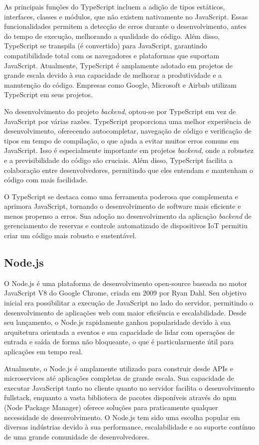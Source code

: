 As principais funções do TypeScript incluem a adição de tipos estáticos, interfaces, classes e módulos, que não existem nativamente no JavaScript. Essas funcionalidades permitem a detecção de erros durante o desenvolvimento, antes do tempo de execução, melhorando a qualidade do código. Além disso, TypeScript se transpila (é convertido) para JavaScript, garantindo compatibilidade total com os navegadores e plataformas que suportam JavaScript. Atualmente, TypeScript é amplamente adotado em projetos de grande escala devido à sua capacidade de melhorar a produtividade e a manutenção do código. Empresas como Google, Microsoft e Airbnb utilizam TypeScript em seus projetos.

No desenvolvimento do projeto \textit{backend}, optou-se por TypeScript em vez de JavaScript por várias razões. TypeScript proporciona uma melhor experiência de desenvolvimento, oferecendo autocompletar, navegação de código e verificação de tipos em tempo de compilação, o que ajuda a evitar muitos erros comuns em JavaScript. Isso é especialmente importante em projetos \textit{backend}, onde a robustez e a previsibilidade do código são cruciais. Além disso, TypeScript facilita a colaboração entre desenvolvedores, permitindo que eles entendam e mantenham o código com mais facilidade.

O TypeScript se destaca como uma ferramenta poderosa que complementa e aprimora JavaScript, tornando o desenvolvimento de software mais eficiente e menos propenso a erros. Sua adoção no desenvolvimento da aplicação \textit{backend} de gerenciamento de reservas e controle automatizado de dispositivos IoT permitiu criar um código mais robusto e sustentável.

\subsection{Node.js}

O Node.js é uma plataforma de desenvolvimento open-source baseada no motor JavaScript V8 do Google Chrome, criada em 2009 por Ryan Dahl. Seu objetivo inicial era possibilitar a execução de JavaScript no lado do servidor, permitindo o desenvolvimento de aplicações web com maior eficiência e escalabilidade. Desde seu lançamento, o Node.js rapidamente ganhou popularidade devido à sua arquitetura orientada a eventos e sua capacidade de lidar com operações de entrada e saída de forma não bloqueante, o que é particularmente útil para aplicações em tempo real.

Atualmente, o Node.js é amplamente utilizado para construir desde APIs e microservices até aplicações completas de grande escala. Sua capacidade de executar JavaScript tanto no cliente quanto no servidor facilita o desenvolvimento fullstack, enquanto a vasta biblioteca de pacotes disponíveis através do npm (Node Package Manager) oferece soluções para praticamente qualquer necessidade de desenvolvimento. O Node.js tem sido uma escolha popular em diversas indústrias devido à sua performance, escalabilidade e ao suporte contínuo de uma grande comunidade de desenvolvedores.

